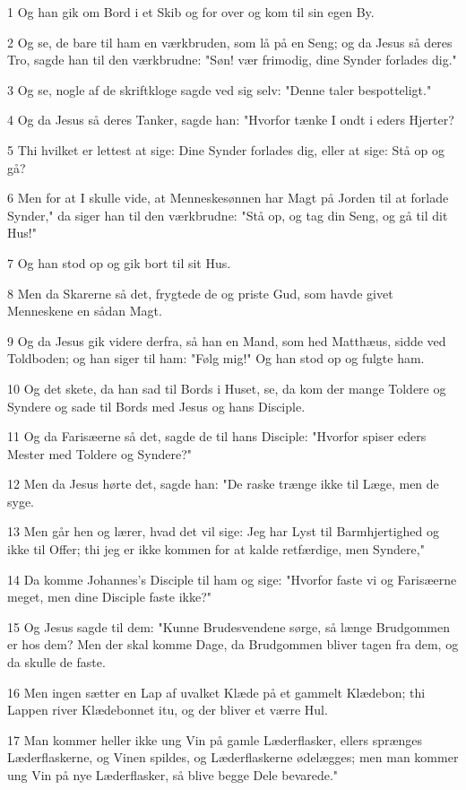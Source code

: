 \par 1 Og han gik om Bord i et Skib og for over og kom til sin egen By.
\par 2 Og se, de bare til ham en værkbruden, som lå på en Seng; og da Jesus så deres Tro, sagde han til den værkbrudne: "Søn! vær frimodig, dine Synder forlades dig."
\par 3 Og se, nogle af de skriftkloge sagde ved sig selv: "Denne taler bespotteligt."
\par 4 Og da Jesus så deres Tanker, sagde han: "Hvorfor tænke I ondt i eders Hjerter?
\par 5 Thi hvilket er lettest at sige: Dine Synder forlades dig, eller at sige: Stå op og gå?
\par 6 Men for at I skulle vide, at Menneskesønnen har Magt på Jorden til at forlade Synder," da siger han til den værkbrudne: "Stå op, og tag din Seng, og gå til dit Hus!"
\par 7 Og han stod op og gik bort til sit Hus.
\par 8 Men da Skarerne så det, frygtede de og priste Gud, som havde givet Menneskene en sådan Magt.
\par 9 Og da Jesus gik videre derfra, så han en Mand, som hed Matthæus, sidde ved Toldboden; og han siger til ham: "Følg mig!" Og han stod op og fulgte ham.
\par 10 Og det skete, da han sad til Bords i Huset, se, da kom der mange Toldere og Syndere og sade til Bords med Jesus og hans Disciple.
\par 11 Og da Farisæerne så det, sagde de til hans Disciple: "Hvorfor spiser eders Mester med Toldere og Syndere?"
\par 12 Men da Jesus hørte det, sagde han: "De raske trænge ikke til Læge, men de syge.
\par 13 Men går hen og lærer, hvad det vil sige: Jeg har Lyst til Barmhjertighed og ikke til Offer; thi jeg er ikke kommen for at kalde retfærdige, men Syndere,"
\par 14 Da komme Johannes's Disciple til ham og sige: "Hvorfor faste vi og Farisæerne meget, men dine Disciple faste ikke?"
\par 15 Og Jesus sagde til dem: "Kunne Brudesvendene sørge, så længe Brudgommen er hos dem? Men der skal komme Dage, da Brudgommen bliver tagen fra dem, og da skulle de faste.
\par 16 Men ingen sætter en Lap af uvalket Klæde på et gammelt Klædebon; thi Lappen river Klædebonnet itu, og der bliver et værre Hul.
\par 17 Man kommer heller ikke ung Vin på gamle Læderflasker, ellers sprænges Læderflaskerne, og Vinen spildes, og Læderflaskerne ødelægges; men man kommer ung Vin på nye Læderflasker, så blive begge Dele bevarede."
